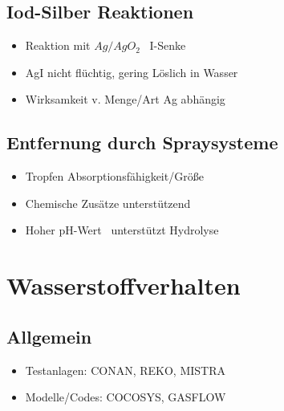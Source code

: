 \documentclass[12pt]{article}
\begin{document}
\subsection{Iod-Silber Reaktionen}
\begin{itemize}
	\item Reaktion mit \(Ag/AgO_2\) \textrightarrow\ I-Senke
	\item AgI nicht flüchtig, gering Löslich in Wasser
	\item Wirksamkeit v. Menge/Art Ag abhängig
\end{itemize}

\subsection{Entfernung durch Spraysysteme}
\begin{itemize}
	\item Tropfen Absorptionsfähigkeit/Größe
	\item Chemische Zusätze unterstützend
	\item Hoher pH-Wert \textrightarrow\ unterstützt Hydrolyse
\end{itemize}

\section{Wasserstoffverhalten}

\subsection{Allgemein}
\begin{itemize}
	\item Testanlagen: CONAN, REKO, MISTRA
	\item Modelle/Codes: COCOSYS, GASFLOW
\end{itemize}
\end{document}
